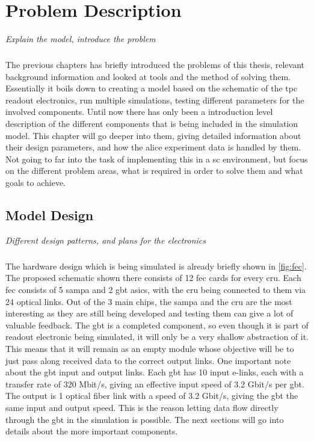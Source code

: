 \documentclass[a4paper, 12pt]{report}
\begin{document}
\chapter{Problem Description}
\textit{Explain the model, introduce the problem}
\label{cha:4}

\paragraph{}
The previous chapters has briefly introduced the problems of this thesis, relevant background information and looked at tools and the method of solving them.
Essentially it boils down to creating a model based on the schematic of the \gls{tpc} readout electronics, run multiple simulations, testing different parameters for the involved components.
Until now there has only been a introduction level description of the different components that is being included in the simulation model.
This chapter will go deeper into them, giving detailed information about their design parameters, and how the \gls{alice} experiment data is handled by them.
Not going to far into the task of implementing this in a \gls{sc} environment, but focus on the different problem areas, what is required in order to solve them and what goals to achieve.

\section{Model Design}
\textit{Different design patterns, and plans for the electronics}
\paragraph{}
The hardware design which is being simulated is already briefly shown in \ref{fig:fec}.
The proposed schematic shown there consists of 12 \gls{fec} cards for every \gls{cru}.
Each \gls{fec} consists of 5 \gls{sampa} and 2 \gls{gbt} \glspl{asic}, with the \gls{cru} being connected to them via 24 optical links.
Out of the 3 main chips, the \gls{sampa} and the \gls{cru} are the most interesting as they are still being developed and testing them can give a lot of valuable feedback.
The \gls{gbt} is a completed component, so even though it is part of readout electronic being simulated, it will only be a very shallow abstraction of it.
This means that it will remain as an empty module whose objective will be to just pass along received data to the correct output links.
One important note about the \gls{gbt} input and output links.
Each \gls{gbt} has 10 input e-links, each with a transfer rate of 320 Mbit/s, giving an effective input speed of 3.2 Gbit/s per \gls{gbt}.
The output is 1 optical fiber link with a speed of 3.2 Gbit/s, giving the \gls{gbt} the same input and output speed.
This is the reason letting data flow directly through the \gls{gbt} in the simulation is possible.
The next sections will go into details about the more important components.
\end{document}
